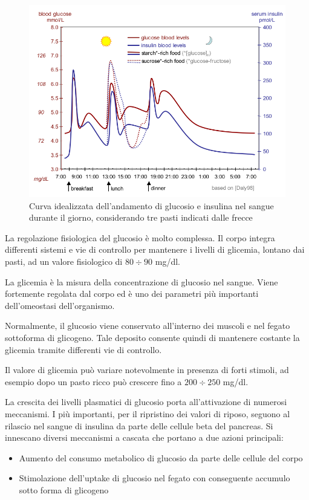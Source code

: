\begin{figure}[b!]
	\centering
	\includegraphics[width=0.99\linewidth]{figures/glucose_regolation2}
	\caption{Curva idealizzata dell'andamento di glucosio e insulina nel sangue durante il giorno, considerando tre pasti indicati dalle frecce \cite{daly_acute_1998}}
	\label{fig:glucoseregolation2}
\end{figure}

La regolazione fisiologica del glucosio è molto complessa. Il corpo integra differenti sistemi e vie di controllo per mantenere i livelli di glicemia, lontano dai pasti, ad un valore fisiologico di $80\div 90$ mg/dl.

La glicemia è la misura della concentrazione di glucosio nel sangue. Viene fortemente regolata dal corpo ed è uno dei parametri più importanti dell'omeostasi dell'organismo. 

Normalmente, il glucosio viene conservato all'interno dei muscoli e nel fegato sottoforma di glicogeno. Tale deposito consente quindi di mantenere costante la glicemia tramite differenti vie di controllo.

Il valore di glicemia può variare notevolmente in presenza di forti stimoli, ad esempio dopo un pasto ricco può crescere fino a $200\div 250$ mg/dl.

La crescita dei livelli plasmatici di glucosio porta all'attivazione di numerosi meccanismi. I più importanti, per il ripristino dei valori di riposo, seguono al rilascio nel sangue di insulina da parte delle cellule beta del pancreas. Si innescano diversi meccanismi a cascata che portano a due azioni principali:
\begin{itemize}
	\item Aumento del consumo metabolico di glucosio da parte delle cellule del corpo
	\item Stimolazione dell'uptake di glucosio nel fegato con conseguente accumulo sotto forma di glicogeno
\end{itemize}

